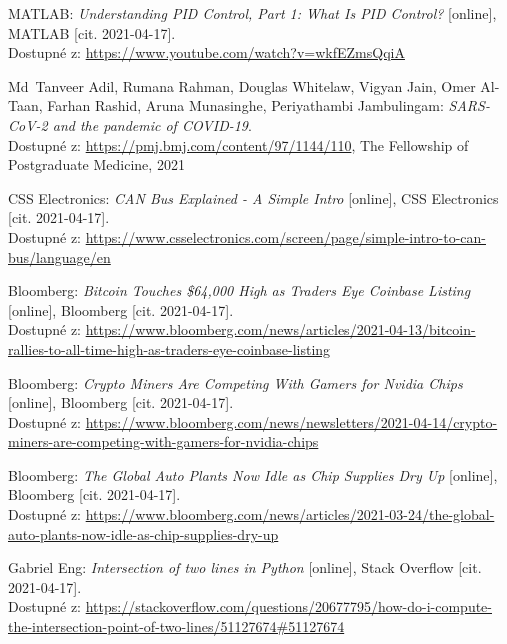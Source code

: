 \documentclass[czech, bachelor]{diploma}
\begin{document}
\renewcommand{\bibname}{Zdroje}
\begin{thebibliography}{20}

MATLAB: \textit{Understanding PID Control, Part 1: What Is PID Control?} [online], MATLAB [cit. 2021-04-17]. \\
Dostupné z: \url{https://www.youtube.com/watch?v=wkfEZmsQqiA}

Md~Tanveer Adil, Rumana Rahman, Douglas Whitelaw, Vigyan Jain, Omer Al-Taan, Farhan Rashid, Aruna Munasinghe,
Periyathambi Jambulingam: \textit{SARS-CoV-2 and the pandemic of COVID-19}. \\
Dostupné z: \url{https://pmj.bmj.com/content/97/1144/110}, The Fellowship of Postgraduate Medicine, 2021

CSS Electronics: \textit{CAN Bus Explained - A Simple Intro} [online], CSS Electronics [cit. 2021-04-17]. \\
Dostupné z: \url{https://www.csselectronics.com/screen/page/simple-intro-to-can-bus/language/en}

Bloomberg: \textit{Bitcoin Touches \$64,000 High as Traders Eye Coinbase Listing} [online], Bloomberg [cit. 2021-04-17]. \\
Dostupné z:
\url{https://www.bloomberg.com/news/articles/2021-04-13/bitcoin-rallies-to-all-time-high-as-traders-eye-coinbase-listing}

Bloomberg: \textit{Crypto Miners Are Competing With Gamers for Nvidia Chips} [online], Bloomberg [cit. 2021-04-17]. \\
Dostupné z:
\url{https://www.bloomberg.com/news/newsletters/2021-04-14/crypto-miners-are-competing-with-gamers-for-nvidia-chips}

Bloomberg: \textit{The Global Auto Plants Now Idle as Chip Supplies Dry Up} [online], Bloomberg [cit. 2021-04-17]. \\
Dostupné z:
\url{https://www.bloomberg.com/news/articles/2021-03-24/the-global-auto-plants-now-idle-as-chip-supplies-dry-up}

Gabriel Eng: \textit{Intersection of two lines in Python} [online], Stack Overflow [cit. 2021-04-17]. \\
Dostupné z:
\url{https://stackoverflow.com/questions/20677795/how-do-i-compute-the-intersection-point-of-two-lines/51127674\#51127674}


\end{thebibliography}
\end{document}
